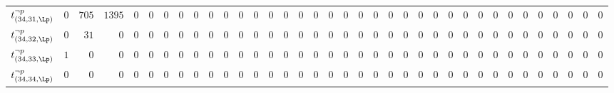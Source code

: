 \begin{tabular}{r|rrrrrrrrrrrrrrrrrrrrrrrrrrrrrrrrrrr}
  $t^{\neg p}_{(34,31,\Lp)}$ & $0$ & $705$ & $1395$ & $0$ & $0$ & $0$ & $0$ & $0$ & $0$ & $0$ & $0$ & $0$ & $0$ & $0$ & $0$ & $0$ & $0$ & $0$ & $0$ & $0$ & $0$ & $0$ & $0$ & $0$ & $0$ & $0$ & $0$ & $0$ & $0$ & $0$ & $0$ & $0$ & $0$ & $0$ & $0$ \\
  $t^{\neg p}_{(34,32,\Lp)}$ & $0$ & $31$ & $0$ & $0$ & $0$ & $0$ & $0$ & $0$ & $0$ & $0$ & $0$ & $0$ & $0$ & $0$ & $0$ & $0$ & $0$ & $0$ & $0$ & $0$ & $0$ & $0$ & $0$ & $0$ & $0$ & $0$ & $0$ & $0$ & $0$ & $0$ & $0$ & $0$ & $0$ & $0$ & $0$ \\
  $t^{\neg p}_{(34,33,\Lp)}$ & $1$ & $0$ & $0$ & $0$ & $0$ & $0$ & $0$ & $0$ & $0$ & $0$ & $0$ & $0$ & $0$ & $0$ & $0$ & $0$ & $0$ & $0$ & $0$ & $0$ & $0$ & $0$ & $0$ & $0$ & $0$ & $0$ & $0$ & $0$ & $0$ & $0$ & $0$ & $0$ & $0$ & $0$ & $0$ \\
  $t^{\neg p}_{(34,34,\Lp)}$ & $0$ & $0$ & $0$ & $0$ & $0$ & $0$ & $0$ & $0$ & $0$ & $0$ & $0$ & $0$ & $0$ & $0$ & $0$ & $0$ & $0$ & $0$ & $0$ & $0$ & $0$ & $0$ & $0$ & $0$ & $0$ & $0$ & $0$ & $0$ & $0$ & $0$ & $0$ & $0$ & $0$ & $0$ & $0$ \\
\end{tabular}
